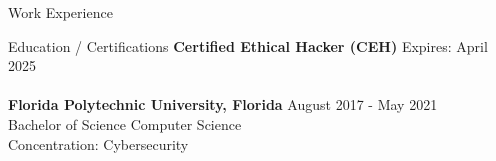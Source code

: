 \documentclass{resume} %
\begin{document}
\begin{rSection}{Work Experience}
	\end{rSection}




\begin{rSection}{Education / Certifications}
{\bf Certified Ethical Hacker (CEH)} \hfill { Expires: April 2025}\\
\\{\bf Florida Polytechnic University, Florida} \hfill { August 2017 - May 2021} 
\\ Bachelor of Science Computer Science\hfill %
\\ Concentration: Cybersecurity 
\end{rSection}







\end{document}
